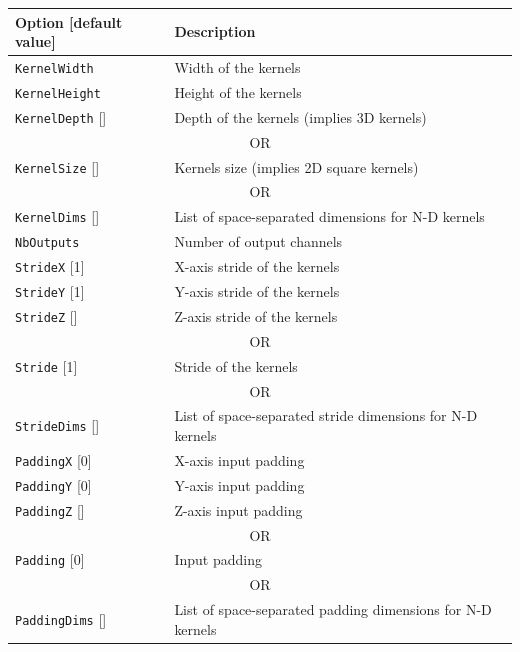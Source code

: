 \documentclass[a4paper,11pt,oneside]{article}
\begin{document}
\begin{center}
 \begin{longtable}{| p{5cm} | p{10cm} | }
 \hline
 Option [default value] & Description\\
 \hline\hline
  \cellcolor{requiredcolor}\lstinline!KernelWidth! & Width of the kernels \\
  \cellcolor{requiredcolor}\lstinline!KernelHeight! & Height of the kernels \\
  \lstinline!KernelDepth! [] & Depth of the kernels (implies 3D kernels) \\
  \multicolumn{2}{|c|}{\cellcolor{clrgray}\tiny OR} \\
  \cellcolor{requiredcolor}\lstinline!KernelSize! [] & Kernels size (implies 2D square kernels) \\
  \multicolumn{2}{|c|}{\cellcolor{clrgray}\tiny OR} \\
  \cellcolor{requiredcolor}\lstinline!KernelDims! [] & List of space-separated dimensions for N-D kernels \\
  \hline
  \cellcolor{requiredcolor}\lstinline!NbOutputs! & Number of output channels \\
  \hline
  \lstinline!StrideX! [1] & X-axis stride of the kernels \\
  \lstinline!StrideY! [1] & Y-axis stride of the kernels \\
  \lstinline!StrideZ! [] & Z-axis stride of the kernels \\
  \multicolumn{2}{|c|}{\cellcolor{clrgray}\tiny OR} \\
  \lstinline!Stride! [1] & Stride of the kernels \\
  \multicolumn{2}{|c|}{\cellcolor{clrgray}\tiny OR} \\
  \lstinline!StrideDims! [] & List of space-separated stride dimensions for N-D kernels \\
  \hline
  \lstinline!PaddingX! [0] & X-axis input padding \\
  \lstinline!PaddingY! [0] & Y-axis input padding \\
  \lstinline!PaddingZ! [] & Z-axis input padding \\
  \multicolumn{2}{|c|}{\cellcolor{clrgray}\tiny OR} \\
  \lstinline!Padding! [0] & Input padding \\
  \multicolumn{2}{|c|}{\cellcolor{clrgray}\tiny OR} \\
  \lstinline!PaddingDims! [] & List of space-separated padding dimensions for N-D kernels \\

\end{longtable}
\end{center}
\end{document}
